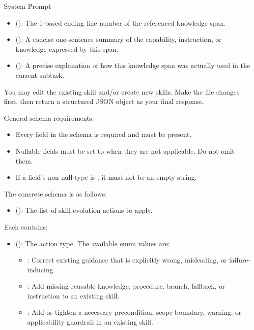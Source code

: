 \begin{svpromptbox}{System Prompt}
\begin{itemize}
\item {} (): The 1-based ending line number of the referenced knowledge span.
\item {} (): A concise one-sentence summary of the capability, instruction, or knowledge expressed by this span.
\item {} (): A precise explanation of how this knowledge span was actually used in the current subtask.
\end{itemize}
\smallskip
{}
\smallskip
You may edit the existing skill and/or create new skills. Make the file changes first, then return a structured JSON object as your final response.\par
\smallskip
General schema requirements:\par
\smallskip
\begin{itemize}
\item Every field in the schema is required and must be present.
\item Nullable fields must be set to  when they are not applicable. Do not omit them.
\item If a field's non-null type is , it must not be an empty string.
\end{itemize}
\smallskip
The concrete schema is as follows:\par
\smallskip
\begin{itemize}
\item {} (): The list of skill evolution actions to apply.
\end{itemize}
\smallskip
Each  contains:\par
\smallskip
\begin{itemize}
\item {} (): The action type. The available enum values are:
\begin{itemize}
\item {}: Correct existing guidance that is explicitly wrong, misleading, or failure-inducing.
\item {}: Add missing reusable knowledge, procedure, branch, fallback, or instruction to an existing skill.
\item {}: Add or tighten a necessary precondition, scope boundary, warning, or applicability guardrail in an existing skill.

\end{itemize}
\end{itemize}
\end{svpromptbox}

